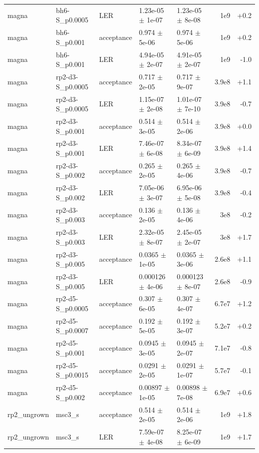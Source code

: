 \documentclass[10pt]{article}
\begin{document}
{\begin{longtable}{l l l l l r r}
magna & bh6-S\_p0.0005 & LER & 1.23e-05 $\pm$ 1e-07 & 1.23e-05 $\pm$ 8e-08 & 1e9 & +0.2 \\
magna & bh6-S\_p0.001 & acceptance & 0.974 $\pm$ 5e-06 & 0.974 $\pm$ 5e-06 & 1e9 & +0.2 \\
magna & bh6-S\_p0.001 & LER & 4.94e-05 $\pm$ 2e-07 & 4.91e-05 $\pm$ 2e-07 & 1e9 & -1.0 \\
magna & rp2-d3-S\_p0.0005 & acceptance & 0.717 $\pm$ 2e-05 & 0.717 $\pm$ 9e-07 & 3.9e8 & +1.1 \\
magna & rp2-d3-S\_p0.0005 & LER & 1.15e-07 $\pm$ 2e-08 & 1.01e-07 $\pm$ 7e-10 & 3.9e8 & -0.7 \\
magna & rp2-d3-S\_p0.001 & acceptance & 0.514 $\pm$ 3e-05 & 0.514 $\pm$ 2e-06 & 3.9e8 & +0.0 \\
magna & rp2-d3-S\_p0.001 & LER & 7.46e-07 $\pm$ 6e-08 & 8.34e-07 $\pm$ 6e-09 & 3.9e8 & +1.4 \\
magna & rp2-d3-S\_p0.002 & acceptance & 0.265 $\pm$ 2e-05 & 0.265 $\pm$ 4e-06 & 3.9e8 & -0.7 \\
magna & rp2-d3-S\_p0.002 & LER & 7.05e-06 $\pm$ 3e-07 & 6.95e-06 $\pm$ 5e-08 & 3.9e8 & -0.4 \\
magna & rp2-d3-S\_p0.003 & acceptance & 0.136 $\pm$ 2e-05 & 0.136 $\pm$ 4e-06 & 3e8 & -0.2 \\
magna & rp2-d3-S\_p0.003 & LER & 2.32e-05 $\pm$ 8e-07 & 2.45e-05 $\pm$ 2e-07 & 3e8 & +1.7 \\
magna & rp2-d3-S\_p0.005 & acceptance & 0.0365 $\pm$ 1e-05 & 0.0365 $\pm$ 3e-06 & 2.6e8 & +1.1 \\
magna & rp2-d3-S\_p0.005 & LER & 0.000126 $\pm$ 4e-06 & 0.000123 $\pm$ 8e-07 & 2.6e8 & -0.9 \\
magna & rp2-d5-S\_p0.0005 & acceptance & 0.307 $\pm$ 6e-05 & 0.307 $\pm$ 4e-07 & 6.7e7 & +1.2 \\
magna & rp2-d5-S\_p0.0007 & acceptance & 0.192 $\pm$ 5e-05 & 0.192 $\pm$ 3e-07 & 5.2e7 & +0.2 \\
magna & rp2-d5-S\_p0.001 & acceptance & 0.0945 $\pm$ 3e-05 & 0.0945 $\pm$ 2e-07 & 7.1e7 & -0.8 \\
magna & rp2-d5-S\_p0.0015 & acceptance & 0.0291 $\pm$ 2e-05 & 0.0291 $\pm$ 1e-07 & 5.7e7 & -0.1 \\
magna & rp2-d5-S\_p0.002 & acceptance & 0.00897 $\pm$ 1e-05 & 0.00898 $\pm$ 7e-08 & 6.9e7 & +0.6 \\
rp2\_ungrown & msc3\_s & acceptance & 0.514 $\pm$ 2e-05 & 0.514 $\pm$ 2e-06 & 1e9 & +1.8 \\
rp2\_ungrown & msc3\_s & LER & 7.59e-07 $\pm$ 4e-08 & 8.25e-07 $\pm$ 6e-09 & 1e9 & +1.7 \\

\end{longtable}}
\end{document}
